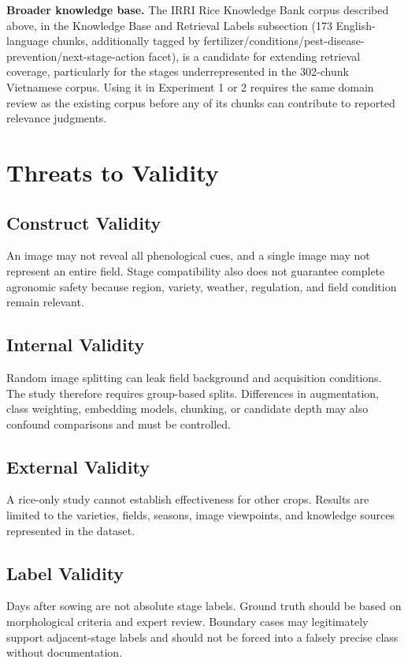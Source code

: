 \documentclass[conference]{IEEEtran}
\begin{document}
\textbf{Broader knowledge base.} The IRRI Rice Knowledge Bank corpus described above, in the Knowledge Base and Retrieval Labels subsection (173 English-language chunks, additionally tagged by fertilizer/conditions/pest-disease-prevention/next-stage-action facet), is a candidate for extending retrieval coverage, particularly for the stages underrepresented in the 302-chunk Vietnamese corpus. Using it in Experiment 1 or 2 requires the same domain review as the existing corpus before any of its chunks can contribute to reported relevance judgments.

\section{Threats to Validity}
\subsection{Construct Validity}
An image may not reveal all phenological cues, and a single image may not represent an entire field. Stage compatibility also does not guarantee complete agronomic safety because region, variety, weather, regulation, and field condition remain relevant.

\subsection{Internal Validity}
Random image splitting can leak field background and acquisition conditions. The study therefore requires group-based splits. Differences in augmentation, class weighting, embedding models, chunking, or candidate depth may also confound comparisons and must be controlled.

\subsection{External Validity}
A rice-only study cannot establish effectiveness for other crops. Results are limited to the varieties, fields, seasons, image viewpoints, and knowledge sources represented in the dataset.

\subsection{Label Validity}
Days after sowing are not absolute stage labels. Ground truth should be based on morphological criteria and expert review. Boundary cases may legitimately support adjacent-stage labels and should not be forced into a falsely precise class without documentation.
\end{document}
